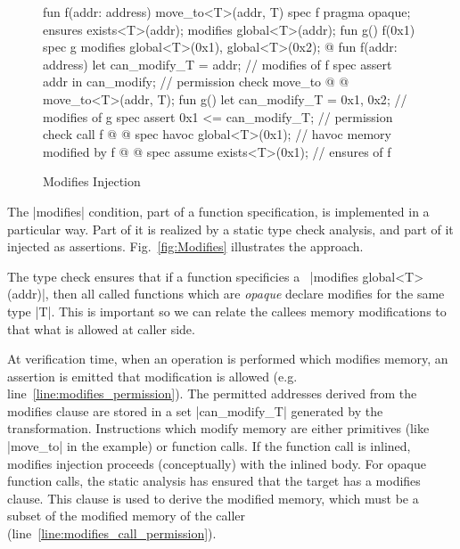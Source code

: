 
\begin{figure}[t!]
  \caption{Modifies Injection}
  \label{fig:Modifies}
  \centering
\begin{MoveBox}
  fun f(addr: address) { move_to<T>(addr, T{}) }
  spec f {
    pragma opaque;
    ensures exists<T>(addr);
    modifies global<T>(addr);
  }
  fun g() { f(0x1) }
  spec g {
    modifies global<T>(0x1), global<T>(0x2);
  }
  @\transform@
  fun f(addr: address) {
    let can_modify_T = {addr};         // modifies of f
    spec assert addr in can_modify;    // permission check move_to @%
                                            \label{line:modifies_permission}@
    move_to<T>(addr, T{});
  }
  fun g() {
    let can_modify_T = {0x1, 0x2};     // modifies of g
    spec assert {0x1} <= can_modify_T; // permission check call f @%
                                            \label{line:modifies_call_permission}@
    spec havoc global<T>(0x1);         // havoc memory modified by f @%
                                            \label{line:modifies_havoc}@
    spec assume exists<T>(0x1);        // ensures of f
  }
\end{MoveBox}
\end{figure}


The |modifies| condition, part of a function specification, is implemented in a
particular way.  Part of it is realized by a static type check analysis, and
part of it injected as assertions. Fig.~\ref{fig:Modifies} illustrates the
approach.

The type check ensures that if a function specificies a~%
|modifies global<T>(addr)|, then all called functions which are \emph{opaque}
declare modifies for the same type |T|. This is important so we can relate the
callees memory modifications to that what is allowed at caller side.

At verification time, when an operation is performed which modifies memory, an
assertion is emitted that modification is allowed
(e.g. line~\ref{line:modifies_permission}). The permitted addresses derived from
the modifies clause are stored in a set |can_modify_T| generated by the
transformation. Instructions which modify memory are either primitives (like
|move_to| in the example) or function calls. If the function call is inlined,
modifies injection proceeds (conceptually) with the inlined body. For opaque
function calls, the static analysis has ensured that the target has a modifies
clause.  This clause is used to derive the modified memory, which must be a
subset of the modified memory of the caller
(line~\ref{line:modifies_call_permission}).

